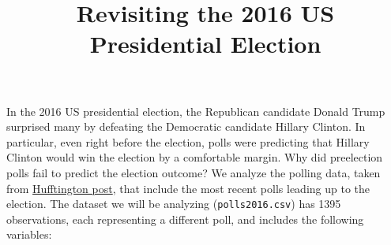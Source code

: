 \documentclass[]{article}
\title{Revisiting the 2016 US Presidential Election}
\author{}
\date{}
\begin{document}
\maketitle


In the 2016 US presidential election, the Republican candidate Donald
Trump surprised many by defeating the Democratic candidate Hillary
Clinton. In particular, even right before the election, polls were
predicting that Hillary Clinton would win the election by a comfortable
margin. Why did preelection polls fail to predict the election outcome?
We analyze the polling data, taken from
\href{http://elections.huffingtonpost.com/pollster\#2016-general-election}{Hufftington
post}, that include the most recent polls leading up to the election.
The dataset we will be analyzing (\texttt{polls2016.csv}) has 1395
observations, each representing a different poll, and includes the
following variables:
\end{document}
